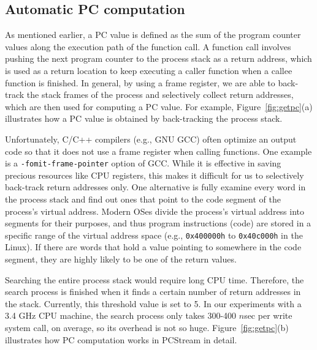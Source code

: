 \vspace{-5pt}
\subsection{Automatic PC computation}
As mentioned earlier, a PC value is defined as the sum of the program counter
values along the execution path of the function call.  A function call involves
pushing the next program counter to the process stack as a return address,
which  is used as a return location to keep executing a caller function when a
callee function is finished.  In general, by using a frame register, we are
able to back-track the stack frames of the process and selectively collect
return addresses, which are then used for computing a PC value. For example,
Figure~\ref{fig:getpc}(a) illustrates how a PC value is obtained by
back-tracking the process stack.

Unfortunately, C/C++ compilers (e.g., GNU GCC) often optimize an output code so
that it does not use a frame register when calling functions.  One example is a
{\tt -fomit-frame-pointer} option of GCC. While it is effective in saving
precious resources like CPU registers, this makes it difficult for us to
selectively back-track return addresses only. One alternative is fully examine
every word in the process stack and find out ones that point to the code
segment of the process's virtual address.  Modern OSes divide the process's
virtual address into segments for their purposes, and thus program instructions
(code) are stored in a specific range of the virtual address space (e.g.,
{\texttt{0x400000h}} to {\texttt{0x40c000h}} in the
Linux).  If there are words that hold a value pointing to somewhere in the code
segment, they are highly likely to be one of the return values.  

Searching the entire process stack would require long CPU time. Therefore, the
search process is finished when it finds a certain number of return addresses
in the stack. Currently, this threshold value is set to 5.  In our experiments
with a 3.4 GHz CPU machine, the search process only takes 300-400 $n$sec per
write system call, on average, so its overhead is not so huge.
Figure~\ref{fig:getpc}(b) illustrates how PC computation works in {\sf PCStream} in
detail.

